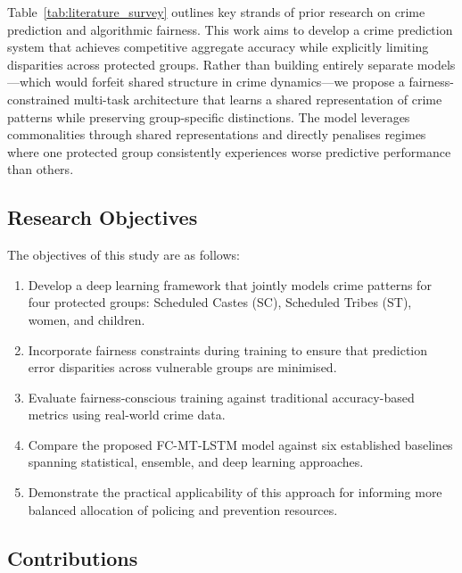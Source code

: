 \documentclass{svproc}
\newcommand{\modelname}{FC-MT-LSTM}
\begin{document}
Table~\ref{tab:literature_survey} outlines key strands of prior research on crime prediction and algorithmic fairness. This work aims to develop a crime prediction system that achieves competitive aggregate accuracy while explicitly limiting disparities across protected groups. Rather than building entirely separate models—which would forfeit shared structure in crime dynamics—we propose a fairness-constrained multi-task architecture that learns a shared representation of crime patterns while preserving group-specific distinctions. The model leverages commonalities through shared representations and directly penalises regimes where one protected group consistently experiences worse predictive performance than others.

\subsection{Research Objectives}

The objectives of this study are as follows:
\begin{enumerate}
\item Develop a deep learning framework that jointly models crime patterns for four protected groups: Scheduled Castes (SC), Scheduled Tribes (ST), women, and children.
\item Incorporate fairness constraints during training to ensure that prediction error disparities across vulnerable groups are minimised.
\item Evaluate fairness-conscious training against traditional accuracy-based metrics using real-world crime data.
\item Compare the proposed \modelname{} model against six established baselines spanning statistical, ensemble, and deep learning approaches.
\item Demonstrate the practical applicability of this approach for informing more balanced allocation of policing and prevention resources.
\end{enumerate}

\subsection{Contributions}
\end{document}
